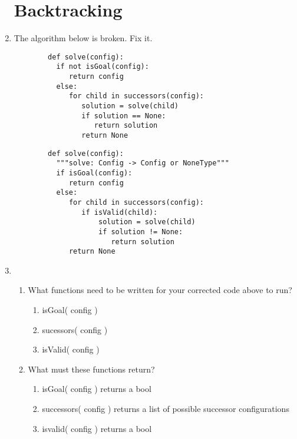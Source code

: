 \documentclass[11pt]{article}
\newenvironment{answer}{\large\lstset{basicstyle=\large}\color{white}}{}
\newenvironment{answer}{\large\lstset{basicstyle=\large}\color{red}}{}
\begin{document}
\begin{enumerate}
\section*{Backtracking}
    \item The algorithm below is broken. Fix it.
    \begin{lstlisting}
        def solve(config):
          if not isGoal(config):
             return config
          else:
             for child in successors(config):
                solution = solve(child)
                if solution == None:
                   return solution
                return None
    \end{lstlisting}        
    \begin{answer}
    \begin{lstlisting}
        def solve(config):
          """solve: Config -> Config or NoneType"""
          if isGoal(config):
             return config
          else:
             for child in successors(config):
                if isValid(child):
                    solution = solve(child)
                    if solution != None:
                       return solution
             return None
    \end{lstlisting}
    \end{answer}
    
    \item
    \begin {enumerate}
        \item What functions need to be written for your corrected code above to run? 
            \begin{answer}
                \begin{enumerate}
                  \item isGoal( config )
                  \item sucessors( config )
                  \item isValid( config )
                \end{enumerate}
            \end{answer}
        \item What must these functions return?
            \begin{answer}
                \begin{enumerate}
                    \item isGoal( config ) returns a bool
                    \item successors( config ) returns a list of possible successor configurations
                    \item isvalid( config ) returns a bool
                \end{enumerate}
            \end{answer}
    \end{enumerate}


\end{enumerate}
\end{document}
